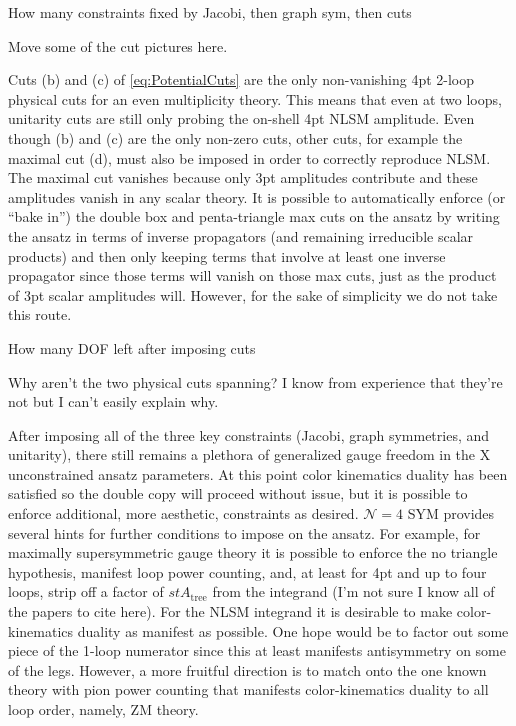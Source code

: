 \documentclass[11pt,letter]{article}
\begin{document}
How many constraints fixed by Jacobi, then graph sym, then cuts

Move some of the cut pictures here.

Cuts (b) and (c) of \cref{eq:PotentialCuts} are the only non-vanishing 4pt 2-loop physical cuts for an even multiplicity theory.
This means that even at two loops, unitarity cuts are still only probing the on-shell 4pt NLSM amplitude.
Even though (b) and (c) are the only non-zero cuts, other cuts, for example the maximal cut (d), must also be imposed in order to correctly reproduce NLSM.
The maximal cut vanishes because only 3pt amplitudes contribute and these amplitudes vanish in any scalar theory.
It is possible to automatically enforce (or ``bake in'') the double box and penta-triangle max cuts on the ansatz by writing the ansatz in terms of inverse propagators (and remaining irreducible scalar products) and then only keeping terms that involve at least one inverse propagator since those terms will vanish on those max cuts, just as the product of 3pt scalar amplitudes will.
However, for the sake of simplicity we do not take this route.

How many DOF left after imposing cuts

Why aren't the two physical cuts spanning?  I know from experience that they're not but I can't easily explain why.

After imposing all of the three key constraints (Jacobi, graph symmetries, and unitarity), there still remains a plethora of generalized gauge freedom in the X unconstrained ansatz parameters.
At this point color kinematics duality has been satisfied so the double copy will proceed without issue, but it is possible to enforce additional, more aesthetic, constraints as desired.
$\mathcal{N}=4$ SYM provides several hints for further conditions to impose on the ansatz.
For example, for maximally supersymmetric gauge theory it is possible to enforce the no triangle hypothesis, manifest loop power counting, and, at least for 4pt and up to four loops, strip off a factor of $st A_\text{tree}$ from the integrand (I'm not sure I know all of the papers to cite here).
For the NLSM integrand it is desirable to make color-kinematics duality as manifest as possible.
One hope would be to factor out some piece of the 1-loop numerator since this at least manifests antisymmetry on some of the legs.
However, a more fruitful direction is to match onto the one known theory with pion power counting that manifests color-kinematics duality to all loop order, namely, ZM theory.
\end{document}
